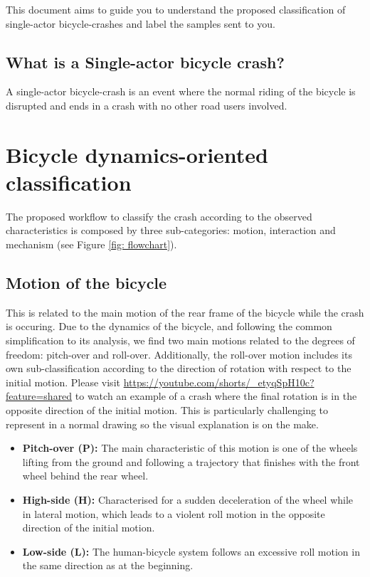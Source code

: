 \documentclass{article}
\begin{document}
This document aims to guide you to understand the proposed classification \cite{Jac04} of single-actor bicycle-crashes and label the samples sent to you.

\subsection{What is a Single-actor bicycle crash?}

A single-actor bicycle-crash is an event where the normal riding of the bicycle is disrupted and ends in a crash with no other road users involved.

\section{Bicycle dynamics-oriented classification}

The proposed workflow to classify the crash according to the observed characteristics is composed by three sub-categories: motion, interaction and mechanism (see Figure \ref{fig: flowchart}).

\subsection{Motion of the bicycle}

This is related to the main motion of the rear frame of the bicycle while the crash is occuring.
%
Due to the dynamics of the bicycle, and following the common simplification to its analysis, we find two main motions related to the degrees of freedom: pitch-over and roll-over.
%
Additionally, the roll-over motion includes its own sub-classification according to the direction of rotation with respect to the initial motion.
% 
Please visit \url{https://youtube.com/shorts/_etyqSpH10c?feature=shared} to watch an example of a crash where the final rotation is in the opposite direction of the initial motion.
%
This is particularly challenging to represent in a normal drawing so the visual explanation is on the make.

\begin{itemize}
    \item \textbf{Pitch-over (P):} The main characteristic of this motion is one of the wheels lifting from the ground and following a trajectory that finishes with the front wheel behind the rear wheel.
    \item \textbf{High-side (H):} Characterised for a sudden deceleration of the wheel while in lateral motion, which leads to a violent roll motion in the opposite direction of the initial motion.
    \item \textbf{Low-side (L):} The human-bicycle system follows an excessive roll motion in the same direction as at the beginning.
\end{itemize}
\end{document}
